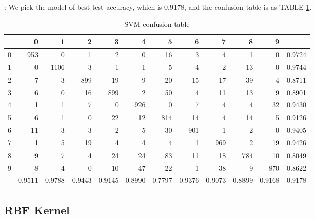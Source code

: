 \documentclass[8pt]{beamer}
\begin{document}
\begin{frame}[allowframebreaks]{\secname : \subsecname}{\subsubsecname}
We pick the model of best test accuracy, which is 0.9178, and the confusion table is as TABLE \ref{SVM confusion table}.

\begin{table}[htbp]
\tiny
  \centering
  \caption{SVM confusion table}
\begin{tabular}{|r|rrrrrrrrrr|r|}
\hline
  & 0 & 1 & 2 & 3 & 4 & 5 & 6 & 7 & 8 & 9 &  \\
\hline
0 & 953 & 0 & 1 & 2 & 0 & 16 & 3 & 4 & 1 & 0 & 0.9724 \\
1 & 0 & 1106 & 3 & 1 & 1 & 5 & 4 & 2 & 13 & 0 & 0.9744 \\
2 & 7 & 3 & 899 & 19 & 9 & 20 & 15 & 17 & 39 & 4 & 0.8711 \\
3 & 6 & 0 & 16 & 899 & 2 & 50 & 4 & 11 & 13 & 9 & 0.8901 \\
4 & 1 & 1 & 7 & 0 & 926 & 0 & 7 & 4 & 4 & 32 & 0.9430 \\
5 & 6 & 1 & 0 & 22 & 12 & 814 & 14 & 4 & 14 & 5 & 0.9126 \\
6 & 11 & 3 & 3 & 2 & 5 & 30 & 901 & 1 & 2 & 0 & 0.9405 \\
7 & 1 & 5 & 19 & 4 & 4 & 4 & 1 & 969 & 2 & 19 & 0.9426 \\
8 & 9 & 7 & 4 & 24 & 24 & 83 & 11 & 18 & 784 & 10 & 0.8049 \\
9 & 8 & 4 & 0 & 10 & 47 & 22 & 1 & 38 & 9 & 870 & 0.8622 \\
\hline
  & 0.9511 & 0.9788 & 0.9443 & 0.9145 & 0.8990 & 0.7797 & 0.9376 & 0.9073 & 0.8899 & 0.9168 & 0.9178 \\
\hline
\end{tabular}%
  \label{SVM confusion table}%
\end{table}%
\end{frame}





\subsection{RBF Kernel}
\end{document}
